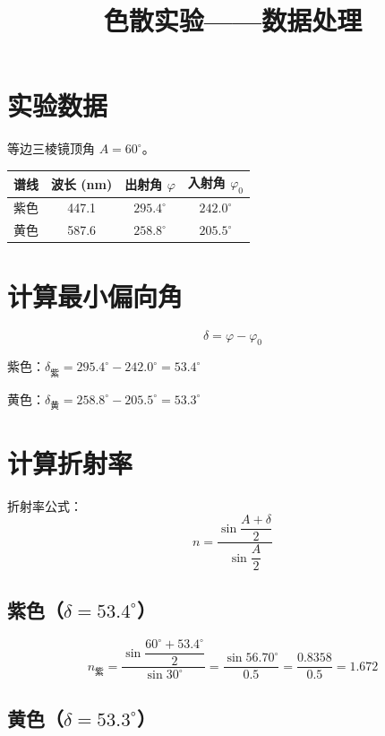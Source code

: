 \documentclass[12pt,a4paper]{ctexart}
\title{色散实验——数据处理}
\author{}
\date{}
\begin{document}
\maketitle

\section{实验数据}

等边三棱镜顶角 $A = 60^\circ$。

\begin{table}[h]
\centering
\begin{tabular}{cccc}
\toprule
谱线 & 波长 (nm) & 出射角 $\varphi$ & 入射角 $\varphi_0$ \\
\midrule
紫色 & 447.1 & $295.4^\circ$ & $242.0^\circ$ \\
黄色 & 587.6 & $258.8^\circ$ & $205.5^\circ$ \\
\bottomrule
\end{tabular}
\end{table}

\section{计算最小偏向角}

\[
\delta = \varphi - \varphi_0
\]

紫色：$\delta_{\text{紫}} = 295.4^\circ - 242.0^\circ = 53.4^\circ$

黄色：$\delta_{\text{黄}} = 258.8^\circ - 205.5^\circ = 53.3^\circ$

\section{计算折射率}

折射率公式：
\[
n = \frac{\sin\dfrac{A + \delta}{2}}{\sin\dfrac{A}{2}}
\]

\subsection{紫色（$\delta = 53.4^\circ$）}

\[
n_{\text{紫}} = \frac{\sin\dfrac{60^\circ + 53.4^\circ}{2}}{\sin 30^\circ}
= \frac{\sin 56.70^\circ}{0.5}
= \frac{0.8358}{0.5}
= \boxed{1.672}
\]

\subsection{黄色（$\delta = 53.3^\circ$）}
\end{document}
